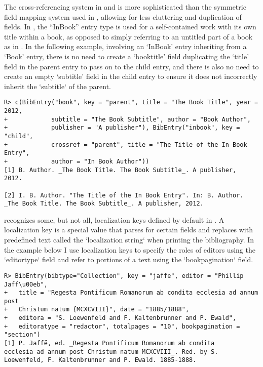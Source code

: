 \documentclass[article]{jss}\usepackage[]{graphicx}\usepackage[]{color}
\makeatletter
\newenvironment{kframe}{%
 \def\at@end@of@kframe{}%
 \ifinner\ifhmode%
  \def\at@end@of@kframe{\end{minipage}}%
  \begin{minipage}{\columnwidth}%
 \fi\fi%
 \def\FrameCommand##1{\hskip\@totalleftmargin \hskip-\fboxsep
 \colorbox{shadecolor}{##1}\hskip-\fboxsep
     \hskip-\linewidth \hskip-\@totalleftmargin \hskip\columnwidth}%
 \MakeFramed {\advance\hsize-\width
   \@totalleftmargin\z@ \linewidth\hsize
   \@setminipage}}%
 {\par\unskip\endMakeFramed%
 \at@end@of@kframe}
\newenvironment{knitrout}{}{} %
\newcommand{\ourpkg}{\pkg{RefManageR}}
\makeatother
\begin{document}
The cross-referencing system in \Biblatex{} and \ourpkg{} is more sophisticated than the symmetric field mapping system used in \Bibtex{}, allowing for less cluttering and duplication of fields.  In \Biblatex{}, the ``InBook'' entry type is used for a self-contained work with its own title within a book, as opposed to simply referring to an untitled part of a book as in \Bibtex{}. In the following example, involving an `InBook' entry inheriting from a `Book' entry, there is no need to create a `booktitle' field duplicating the `title' field in the parent entry to pass on to the child entry, and there is also no need to create an empty `subtitle' field in the child entry to ensure it does not incorrectly inherit the `subtitle` of the parent.  
\begin{knitrout}
\color{fgcolor}\begin{kframe}
\begin{verbatim}
R> c(BibEntry("book", key = "parent", title = "The Book Title", year = 2012, 
+            subtitle = "The Book Subtitle", author = "Book Author", 
+            publisher = "A publisher"), BibEntry("inbook", key = "child", 
+            crossref = "parent", title = "The Title of the In Book Entry", 
+            author = "In Book Author"))
[1] B. Author. _The Book Title. The Book Subtitle_. A publisher,
2012.

[2] I. B. Author. "The Title of the In Book Entry". In: B. Author.
_The Book Title. The Book Subtitle_. A publisher, 2012.
\end{verbatim}
\end{kframe}
\end{knitrout}


\ourpkg{} recognizes some, but not all, localization keys defined by default in \Biblatex{}.  A localization key is a special value that \Biblatex{} parses for certain fields and replaces with predefined text called the `localization string` when printing the bibliography.  In the example below I use localization keys to specify the roles of editors using the `editortype` field and refer to portions of a text using the `bookpagination` field.
\begin{knitrout}
\color{fgcolor}\begin{kframe}
\begin{verbatim}
R> BibEntry(bibtype="Collection", key = "jaffe", editor = "Phillip Jaff\u00eb", 
+   title = "Regesta Pontificum Romanorum ab condita ecclesia ad annum post
+   Christum natum {MCXCVIII}", date = "1885/1888",
+   editora = "S. Loewenfeld and F. Kaltenbrunner and P. Ewald",
+   editoratype = "redactor", totalpages = "10", bookpagination = "section")
[1] P. Jaffë, ed. _Regesta Pontificum Romanorum ab condita
ecclesia ad annum post Christum natum MCXCVIII_. Red. by S.
Loewenfeld, F. Kaltenbrunner and P. Ewald. 1885-1888.
\end{verbatim}
\end{kframe}
\end{knitrout}
\end{document}

